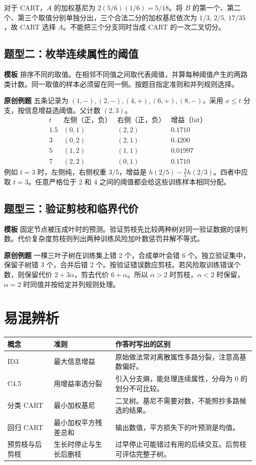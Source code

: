 \documentclass[UTF8,a4paper,zihao=-4,fontset=fandol]{ctexrep}
\begin{document}
对于 CART，$A$ 的加权基尼为 $2(5/6)(1/6)=5/18$。将 $B$ 的第一个、第二个、第三个取值分别单独分出，三个合法二分的加权基尼依次为 $1/3,\,2/5,\,17/35$，故 CART 选择 $A$。不能把三个分支同时当成 CART 的一次二叉切分。

\subsection*{题型二：枚举连续属性的阈值}
\textbf{模板} 排序不同的取值。在相邻不同值之间取代表阈值，并算每种阈值产生的两路类计数。同一取值的样本必须留在同一侧。按题目指定准则和并列规则选择。

\textbf{原创例题} 五条记录为 $(1,-),(2,-),(4,+),(6,+),(8,-)$，采用 $x\le t$ 分支，按信息增益选阈值。父计数 $(2,3)$。
\[
\begin{array}{c|c|c|c}
t&\text{左侧（正，负）}&\text{右侧（正，负）}&\text{增益（bit）}\\\hline
1.5&(0,1)&(2,2)&0.1710\\
3&(0,2)&(2,1)&0.4200\\
5&(1,2)&(1,1)&0.01997\\
7&(2,2)&(0,1)&0.1710
\end{array}
\]
例如 $t=3$ 时，左侧纯，右侧权重 $3/5$，增益是 $h(2/5)-\frac35 h(2/3)$。四者中应取 $t=3$。任意严格位于 2 和 4 之间的阈值都会给这些训练样本相同分配。

\subsection*{题型三：验证剪枝和临界代价}
\textbf{模板} 固定节点被压成叶时的预测。验证剪枝先比较两种树对同一验证数据的误判数。代价复杂度剪枝则列出两种训练风险加叶数惩罚并解不等式。

\textbf{原创例题} 一棵三叶子树在训练集上错 2 个，合成单叶会错 6 个。独立验证集中，保留子树错 3 个，合并后错 2 个。按验证错误数应剪枝。若风险取训练错误个数，则保留代价 $2+3\alpha$，剪去代价 $6+\alpha$。所以 $\alpha>2$ 时剪枝，$\alpha<2$ 时保留，$\alpha=2$ 时同值并按给定并列规则处理。

\section{易混辨析}
\noindent\begin{tabularx}{\linewidth}{@{}l>{\raggedright\arraybackslash}X>{\raggedright\arraybackslash}X@{}}
\toprule
概念 & 准则 & 作答时写出的区别\\
\midrule
ID3 & 最大信息增益 & 原始做法常对离散属性多路分裂，注意高基数偏好。\\
C4.5 & 用增益率选分裂 & 引入分支熵，能处理连续属性，分母为 0 的划分不可比较。\\
分类 CART & 最小加权基尼 & 二叉树。基尼不需要对数，不能照抄多路候选的结果。\\
回归 CART & 最小加权平方残差总和 & 输出数值，平方损失下的叶预测是均值。\\
预剪枝与后剪枝 & 生长时停止与生长后删枝 & 过早停止可能错过有用的后续交互。后剪枝可评估完整子树。\\
\bottomrule
\end{tabularx}
\end{document}
